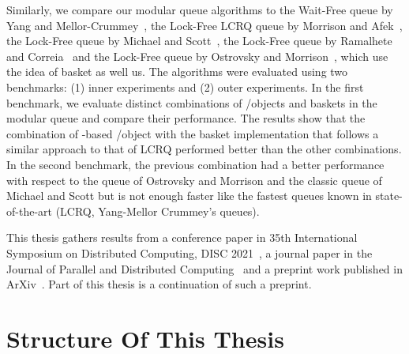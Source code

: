 Similarly, we compare our modular queue algorithms to the Wait-Free queue by Yang and Mellor-Crummey~\cite{DBLP_conf_ppopp_YangM16}, the Lock-Free LCRQ queue by Morrison and Afek~\cite{ppopp2013x86queues}, the Lock-Free queue by Michael and Scott~\cite{DBLP_conf_podc_MichaelS96}, the Lock-Free queue by Ramalhete and Correia~\cite{Ramalhete_Correia_MPMC_2016} and the Lock-Free queue by Ostrovsky and Morrison~\cite{scalingconcurrent2020}, which use the idea of basket as well us. The algorithms were evaluated using two benchmarks: (1) inner experiments and (2) outer experiments. In the first benchmark, we evaluate distinct combinations of \LL/\IC objects and baskets in the modular queue and compare their performance. The results show that the combination of \CAS-based \LL/\IC object with the basket implementation that follows a similar approach to that of LCRQ performed better than the other combinations. In the second benchmark, the previous combination had a better performance with respect to the queue of Ostrovsky and Morrison and the classic queue of Michael and Scott but is not enough faster like the fastest queues known in state-of-the-art (LCRQ, Yang-Mellor Crummey's queues).

This thesis gathers results from a conference paper in 35th International Symposium on Distributed Computing, DISC 2021~\cite{DBLP_conf_wdag_CastanedaP21}, a journal paper in the Journal of Parallel and Distributed Computing~\cite{DBLP_journals_jpdc_CastanedaP24} and a preprint work published in ArXiv~\cite{arxiv_2205_06323}. Part of this thesis is a continuation of such a preprint.
\section{\label{section:Organization}Structure Of This Thesis}

